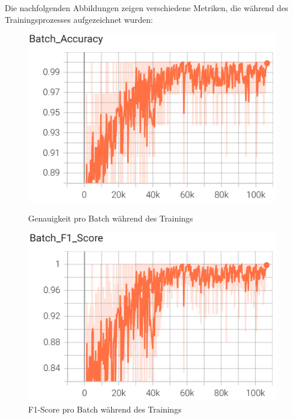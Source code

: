 \documentclass[11pt,a4paper]{article}
\begin{document}
\noindent \newline
Die nachfolgenden Abbildungen zeigen verschiedene Metriken, die während des Trainingsprozesses 
aufgezeichnet wurden:

\begin{figure}[H]
    \centering
    \begin{minipage}{0.48\textwidth}
        \includegraphics[width=\textwidth]{img/train/batch_accuracy.png}
        \caption{Genauigkeit pro Batch während des Trainings}
        \label{fig:batch_accuracy}
    \end{minipage}\hfill
    \begin{minipage}{0.48\textwidth}
        \includegraphics[width=\textwidth]{img/train/batch_f1.png}
        \caption{F1-Score pro Batch während des Trainings}
        \label{fig:batch_f1}
    \end{minipage}
\end{figure}
\end{document}
